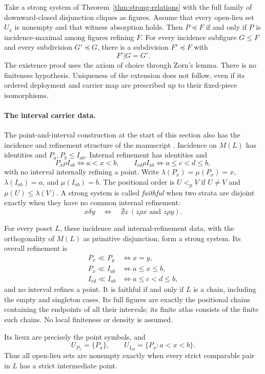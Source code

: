 \begin{theorem}
\label{thm:abstract-extension}
Take a strong system of Theorem~\ref{thm:strong-relations} with
the full family of downward-closed disjunction cliques as figures.
Assume that every open-lieu set $U_x$ is nonempty and that
witness absorption holds. Then $P\preceq F$ if and only if
$P$ is incidence-maximal among figures refining $F$.
For every incidence subfigure $G\leq F$ and every subdivision
$G'\preceq G$, there is a subdivision $F'\preceq F$ with
\[
 F'|G=G'.
\]
The existence proof uses the axiom of choice through Zorn's lemma.
There is no finiteness hypothesis. Uniqueness of the extension
does not follow, even if its ordered deployment and carrier map
are prescribed up to their fixed-piece isomorphisms.
\end{theorem}

\paragraph{The interval carrier data.}
The point-and-interval construction at the start of this section
also has the incidence and refinement structure of the manuscript
\cite[part~9, archive sheets~4--7, PDF pp.~5--8]{Groth}.
Incidence on $M(L)$ has identities and
$P_a,P_b\leq I_{ab}$. Internal refinement has identities and
\[
 P_x\rho I_{ab}\iff a<x<b,\qquad
 I_{cd}\rho I_{ab}\iff a\leq c<d\leq b,
\]
with no interval internally refining a point.
Write $\lambda(P_x)=\mu(P_x)=x$,
$\lambda(I_{ab})=a$, and $\mu(I_{ab})=b$.
The positional order is
$U<_{\mathrm p}V$ if $U\ne V$ and
$\mu(U)\leq\lambda(V)$.
A strong system is called \emph{faithful} when two strata are
disjoint exactly when they have no common internal refinement:
\[
 x\delta y\quad\Longleftrightarrow\quad
 \nexists z\ (z\rho x\text{ and }z\rho y).
\]

\begin{theorem}
\label{thm:interval-system}
For every poset $L$, these incidence and internal-refinement data,
with the orthogonality of $M(L)$ as primitive disjunction, form
a strong system. Its overall refinement is
\[
 \begin{aligned}
 P_x\ll P_y&\iff x=y,\\
 P_x\ll I_{ab}&\iff a\leq x\leq b,\\
 I_{cd}\ll I_{ab}&\iff a\leq c<d\leq b,
 \end{aligned}
\]
and no interval refines a point. It is faithful if and only if
$L$ is a chain, including the empty and singleton cases.
Its full figures are exactly the positional chains containing
the endpoints of all their intervals; its finite atlas consists
of the finite such chains. No local finiteness or density is
assumed.

Its lieux are precisely the point symbols, and
\[
 U_{P_x}=\{P_x\},\qquad U_{I_{ab}}=\{P_x:a<x<b\}.
\]
Thus all open-lieu sets are nonempty exactly when every strict
comparable pair in $L$ has a strict intermediate point.
\end{theorem}

